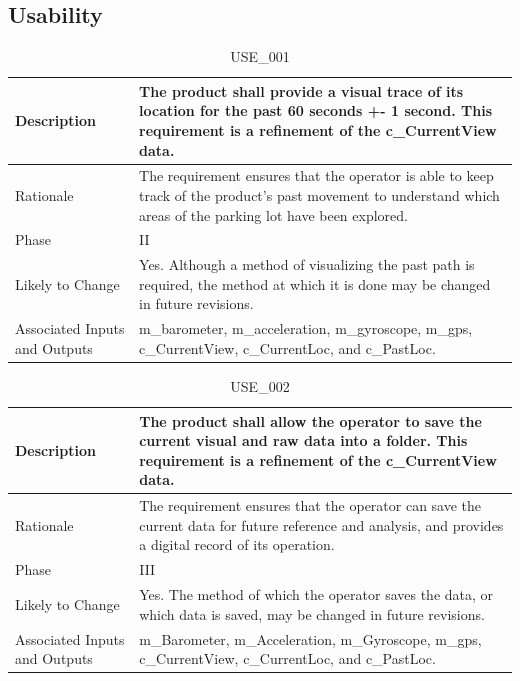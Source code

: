 \documentclass{article}
\begin{document}
\subsection{Usability}
\begin{table}[!h]
\begin{center}
\caption {USE\_001} 
\label{USE_001}
\begin{tabular}{ | m{3cm} | m{11cm} | }
\hline
Description & The product shall provide a visual trace of its location for the past 60 seconds +- 1 second. This requirement is a refinement of the c\_CurrentView data. \\
\hline
Rationale & The requirement ensures that the operator is able to keep track of the product's past movement to understand which areas of the parking lot have been explored. \\
\hline
Phase & II \\
\hline
Likely to Change & Yes. Although a method of visualizing the past path is required, the method at which it is done may be changed in future revisions.  \\
\hline
Associated Inputs and Outputs & m\_barometer, m\_acceleration, m\_gyroscope, m\_gps, c\_CurrentView, c\_CurrentLoc, and c\_PastLoc.  \\
\hline
\end{tabular}
\end{center}
\end{table}

\begin{table}[!h]
\begin{center}
\caption {USE\_002} 
\label{USE_002}
\begin{tabular}{ | m{3cm} | m{11cm} | }
\hline
Description & The product shall allow the operator to save the current visual and raw data into a folder. This requirement is a refinement of the c\_CurrentView data. \\
\hline
Rationale & The requirement ensures that the operator can save the current data for future reference and analysis, and provides a digital record of its operation. \\
\hline
Phase & III \\
\hline
Likely to Change & Yes. The method of which the operator saves the data, or which data is saved, may  be changed in future revisions. \\
\hline
Associated Inputs and Outputs & m\_Barometer, m\_Acceleration, m\_Gyroscope, m\_gps, c\_CurrentView, c\_CurrentLoc, and c\_PastLoc.  \\
\hline
\end{tabular}
\end{center}
\end{table}
\end{document}

